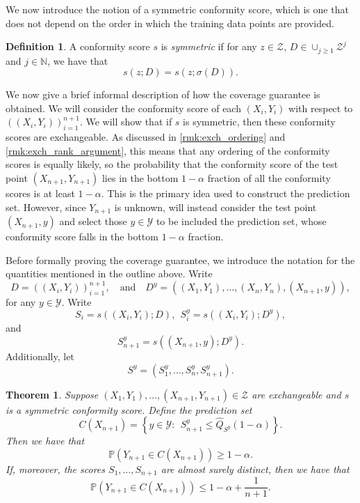 \documentclass[11pt, titlepage]{article} %
\newcommand{\Prob}[1]{\mathbb{P}\left( #1 \right)}
\numberwithin{equation}{section}
\newtheorem{theorem}{Theorem}
\theoremstyle{definition}
\newtheorem{definition}{Definition}
\numberwithin{theorem}{section}
\numberwithin{lemma}{section}
\numberwithin{corollary}{section}
\numberwithin{proposition}{section}
\numberwithin{definition}{section}
\numberwithin{remark}{section}
\begin{document}
\noindent
We now introduce the notion of a symmetric conformity score, which is one that does not depend on the order in which the training data points are provided.

\begin{definition}
    A conformity score \(s\) is \textit{symmetric} if for any \(z \in \mathcal{Z}\), \(D \in \cup_{j \geq 1} \mathcal{Z}^j\) and \(j \in \mathbb{N}\), we have that \[s(z; D) = s(z; \sigma(D)).\]
\label{defn:symmetric_conformityscore}
\end{definition}

\noindent
We now give a brief informal description of how the coverage guarantee is obtained. We will consider the conformity score of each \((X_i, Y_i)\) with respect to \(((X_i, Y_i))_{i=1}^{n+1}\). We will show that if \(s\) is symmetric, then these conformity scores are exchangeable. As discussed in \cref{rmk:exch_ordering} and \cref{rmk:exch_rank_argument}, this means that any ordering of the conformity scores is equally likely, so the probability that the conformity score of the test point \((X_{n+1}, Y_{n+1})\) lies in the bottom \(1-\alpha\) fraction of all the conformity scores is at least \(1-\alpha\). This is the primary idea used to construct the prediction set. However, since \(Y_{n+1}\) is unknown, will instead consider the test point \((X_{n+1}, y)\) and select those \(y \in \mathcal{Y}\) to be included the prediction set, whose conformity score falls in the bottom \(1-\alpha\) fraction. \vskip5pt

\noindent
Before formally proving the coverage guarantee, we introduce the notation for the quantities mentioned in the outline above. Write \[D = ((X_i, Y_i))_{i=1}^{n+1}, \quad \text{and} \quad D^{y} = ((X_1, Y_1), \ldots, (X_n, Y_n), (X_{n+1}, y)), \] for any \(y \in \mathcal{Y}\).  Write \[S_i = s((X_i, Y_i); D), \ \ S_i^y = s((X_i, Y_i); D^y), \] and \[S_{n+1}^y = s((X_{n+1}, y); D^y).\] Additionally, let \[S^y = (S_1^y, \ldots, S_n^y, S_{n+1}^y).\]

\begin{theorem}
    Suppose \((X_1, Y_1), \ldots, (X_{n+1}, Y_{n+1}) \in \mathcal{Z}\) are exchangeable and \(s\) is a symmetric conformity score. Define the prediction set \begin{equation}
        C(X_{n+1}) = \left\{ y \in \mathcal{Y}: \ \ S_{n+1}^y \leq \hat{Q}_{S^y}(1-\alpha) \right\}.
    \label{eqn:fullconformal_prediction_set}
    \end{equation} Then we have that \[\Prob{Y_{n+1} \in C(X_{n+1})} \geq 1-\alpha.\] If, moreover, the scores \(S_1, \ldots, S_{n+1}\) are almost surely distinct, then we have that \[\Prob{Y_{n+1} \in C(X_{n+1})} \leq 1-\alpha + \frac{1}{n+1}.\]

\label{thm:fullconformal_coverage}  
\end{theorem}
\end{document}
